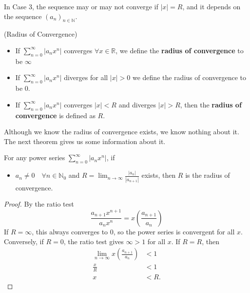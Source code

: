 \begin{remark}
    In Case 3, the sequence may or may not converge if $|x| = R$, and it depends on the sequence $(a_n)_{n \in \mathbb{N}}$.
\end{remark}

\begin{definition} (Radius of Convergence)

    \begin{itemize}
      \item If $\sum_{n=0}^{\infty} | a_n x^n| $ converges $\forall x \in \mathbb{R}$, we define the {\bf radius of convergence} to be $\infty$
        \item If $\sum_{n=0}^{\infty} | a_n x^n| $ diverges for all $|x| > 0$ we define the radius of convergence to be $0$.
        \item If $\sum_{n=0}^{\infty} | a_n x^n| $ converges $|x| < R$ and diverges $|x| > R$, then the {\bf radius of convergence} is defined as $R$.
    \end{itemize}
    
\end{definition}    
Although we know the radius of convergence exists, we know nothing about it. The next theorem gives us some information about it.

\begin{theorem}
    For any power series $\sum_{n=0}^{\infty} | a_n x^n| $, if
    \begin{itemize}
        \item $a_n \not = 0 \quad \forall n \in \mathbb{N}_0$ and $R = \lim_{n\rightarrow \infty} \frac{|a_n|}{|a_{n+1}|}$ exists, then $R$ is the radius of convergence.
    \end{itemize}
\end{theorem}
\begin{proof}
  By the ratio test
    \[\frac{a_{n + 1} x^{n + 1}}{a_n x^n} = x \left( \frac{a_{n + 1}}{a_n}\right)\]
    If $R = \infty$, this always converges to $0$, so the power series is convergent for all $x$. Conversely, if $R = 0$, the ratio test gives $\infty > 1$ for all $x$. If $R = R$, then
    \begin{align*}
      \lim_{n \rightarrow \infty} x \left( \frac{a_{n + 1}}{a_n} \right) &< 1 \\
      \frac{x}{R} &< 1 \\
       x &< R
    .\end{align*}
  \end{proof}
